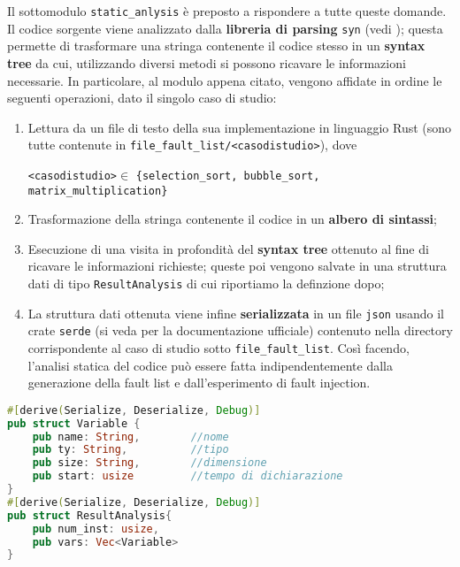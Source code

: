 \noindent
Il sottomodulo \texttt{static\_anlysis} è preposto a rispondere a tutte queste domande. Il codice sorgente viene analizzato dalla \textbf{libreria di parsing} \texttt{syn} (vedi \cite{syn}); questa permette di trasformare una stringa contenente il codice stesso in un \textbf{syntax tree} da cui, utilizzando diversi metodi si possono ricavare le informazioni necessarie. In particolare, al modulo appena citato, vengono affidate in ordine le seguenti operazioni, dato il singolo caso di studio: 
\begin{enumerate}
    \itemsep-0.3em
    \item Lettura da un file di testo della sua implementazione in linguaggio Rust (sono tutte contenute in \newline \texttt{file\_fault\_list/<casodistudio>}), dove 
    \begin{center}
        \texttt{<casodistudio>}$\in$ \texttt{\{selection\_sort, bubble\_sort, matrix\_multiplication\}}
    \end{center}
    \item Trasformazione della stringa contenente il codice in un \textbf{albero di sintassi}; 
    \item Esecuzione di una visita in profondità del  \textbf{syntax tree} ottenuto al fine di ricavare le informazioni richieste; queste poi vengono salvate in una struttura dati di tipo \texttt{ResultAnalysis} di cui riportiamo la definzione dopo;
    \item La struttura dati ottenuta viene infine \textbf{serializzata} in un file \texttt{json} usando il crate \texttt{serde} (si veda \cite{noauthor_serde_nodate} per la documentazione ufficiale) contenuto nella directory corrispondente al caso di studio sotto \texttt{file\_fault\_list}. Così facendo, l'analisi statica del codice può essere fatta indipendentemente dalla generazione della fault list e dall'esperimento di fault injection.
\end{enumerate}

\begin{lstlisting}[language=rust, style=boxed]
#[derive(Serialize, Deserialize, Debug)]
pub struct Variable {
    pub name: String,        //nome 
    pub ty: String,          //tipo       
    pub size: String,        //dimensione
    pub start: usize         //tempo di dichiarazione
}
#[derive(Serialize, Deserialize, Debug)]
pub struct ResultAnalysis{
    pub num_inst: usize,              
    pub vars: Vec<Variable>         
}
\end{lstlisting}

